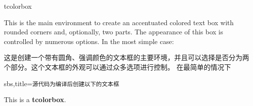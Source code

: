 \begin{docEnvironment}{tcolorbox}{}

This is the main environment to create an accentuated colored text box with
rounded corners and, optionally, two parts. The appearance of this box
is controlled by numerous options.
In the most simple case:

这是创建一个带有圆角、强调颜色的文本框的主要环境，并且可以选择是否分为两个部分。这个文本框的外观可以通过众多选项进行控制。%
在最简单的情况下







\begin{dispExample*}{sbs,title={\tt 源代码为\hfill 编译后创建以下的文本框}}
\begin{tcolorbox}
This is a \textbf{tcolorbox}.
\end{tcolorbox}
\end{dispExample*}


\end{docEnvironment}
